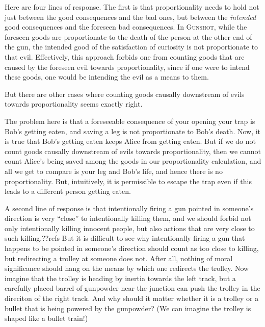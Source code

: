Here are four lines of response. The first is that proportionality needs to hold not just between the good consequences and
the bad ones, but between the \textit{intended} good consequences and the foreseen bad consequences. In \textsc{Gunshot},
while the foreseen goods are proportionate to the death of the person at the other end of the gun, the intended good
of the satisfaction of curiosity is not proportionate to that evil. Effectively, this approach forbids one from counting
goods that are caused by the foreseen evil towards proportionality, since if one were to intend these goods, one would be
intending the evil as a means to them.

But there are other cases where counting goods causally downstream of evils towards proportionality seems exactly right. 

The problem here is that a foreseeable consequence of your opening your trap is Bob's getting eaten, and saving a leg is not
proportionate to Bob's death. Now, it is true that Bob's getting eaten keeps Alice from getting eaten. But if we do not count
goods causally downstream of evils towards proportionality, then we cannot count Alice's being saved among the goods in 
our proportionality calculation, and all we get to compare is your leg and Bob's life, and hence there is no proportionality.
But, intuitively, it is permissible to escape the trap even if this leads to a different person getting eaten.

A second line of response is that intentionally firing a gun pointed in someone's direction is very ``close'' to intentionally
killing them, and we should forbid not only intentionally killing innocent people, but also actions that are very close to such
killing.??refs But it is difficult to see why intentionally firing a gun that happens to be pointed in someone's direction should 
count as too close to killing, but redirecting a trolley at someone does not. After all, nothing of moral significance should
hang on the means by which one redirects the trolley. Now imagine that the trolley is heading by inertia towards the left 
track, but a carefully placed barrel of gunpowder near the junction can push the trolley in the direciton of the right track.
And why should it matter whether it is a trolley or a bullet that is being powered by the gunpowder? (We can imagine the
trolley is shaped like a bullet train!) 

